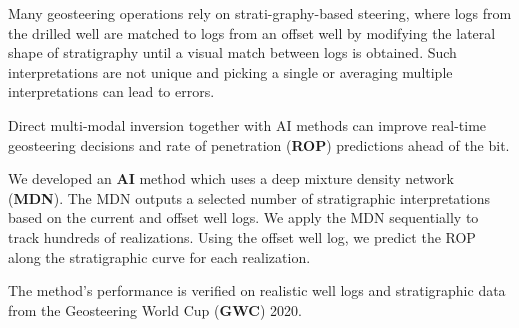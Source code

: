 

Many geosteering operations rely on strati-graphy-based steering, where logs from the drilled well are matched to logs from an offset well by modifying the lateral shape
of stratigraphy until a visual match between logs is obtained. Such interpretations are not unique and picking a single  or averaging multiple interpretations can lead to errors. 

Direct multi-modal inversion together with AI methods can improve real-time geosteering decisions and rate of penetration (\textbf{ROP}) predictions ahead of the bit.

We developed an \textbf{AI} method which uses a deep mixture density network (\textbf{MDN}). The MDN outputs a selected number of stratigraphic interpretations based on the current and offset well logs. We  apply the MDN sequentially to track hundreds of realizations. Using the offset well log, we predict the ROP along the stratigraphic curve for each realization.

The method's performance is verified on realistic well logs and stratigraphic data from the Geosteering World Cup (\textbf{GWC}) 2020.
